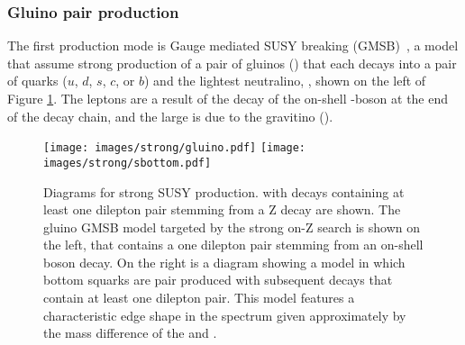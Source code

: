 \subsubsection*{Gluino pair production}
\noindent\justify
The first production mode is Gauge mediated SUSY breaking (GMSB)~\cite{Matchev:1999ft,Meade:2009qv,Ruderman}, a model that assume strong production of a pair of gluinos (\gluino) that each decays into a pair of quarks ($u$, $d$, $s$, $c$, or $b$) and the lightest neutralino, \PSGczDo, shown on the left of Figure \ref{fig:feynmanStrong}. 
The leptons are a result of the decay of the on-shell \PZ-boson at the end of the decay chain, and the large \ptmiss is due to the gravitino (\gravitino). 
\begin{figure}[!htp]
\centering
\texttt{[image: images/strong/gluino.pdf]}
\texttt{[image: images/strong/sbottom.pdf]}
\caption{Diagrams for strong SUSY production.  
with decays containing at least one dilepton pair stemming from a Z decay are shown. 
The gluino GMSB model targeted by the strong on-Z search is shown on the left, that contains a one dilepton pair stemming from an on-shell \PZ boson decay. On the right is a diagram showing a model in which bottom squarks are pair produced with subsequent decays that contain at least one dilepton pair. This model features a characteristic edge shape in the \mll spectrum given approximately by the mass difference of the \PSGczDt and \PSGczDo.}
\label{fig:feynmanStrong}
\end{figure}                                                                                                                                          
